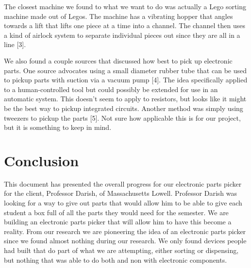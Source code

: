 \documentclass[12pt]{report}
\begin{document}
The closest machine we found to what we want to do was actually a Lego sorting machine made out of Legos. The machine has a vibrating hopper that angles towards a lift that lifts one piece at a time into a channel. The channel then uses a kind of airlock system to separate individual pieces out since they are all in a line [3].


We also found a couple sources that discussed how best to pick up electronic parts. One source advocates using a small diameter rubber tube that can be used to pickup parts with suction via a vacuum pump [4]. The idea specifically applied to a human-controlled tool but could possibly be extended for use in an automatic system. This doesn't seem to apply to resistors, but looks like it might be the best way to pickup integrated circuits. Another method was simply using tweezers to pickup the parts [5]. Not sure how applicable this is for our project, but it is something to keep in mind.

\section*{Conclusion}

This document has presented the overall progress for our electronic parts picker for the client, Professor Darish, of Massachusetts Lowell. Professor Darish was looking for a way to give out parts that would allow him to be able to give each student a box full of all the parts they would need for the semester. We are building an electronic parts picker that will allow him to have this become a reality. From our research we are pioneering the idea of an electronic parts picker since we found almost nothing during our research. We only found devices people had built that do part of what we are attempting, either sorting or dispensing, but nothing that was able to do both and non with electronic components. 



\end{document}
